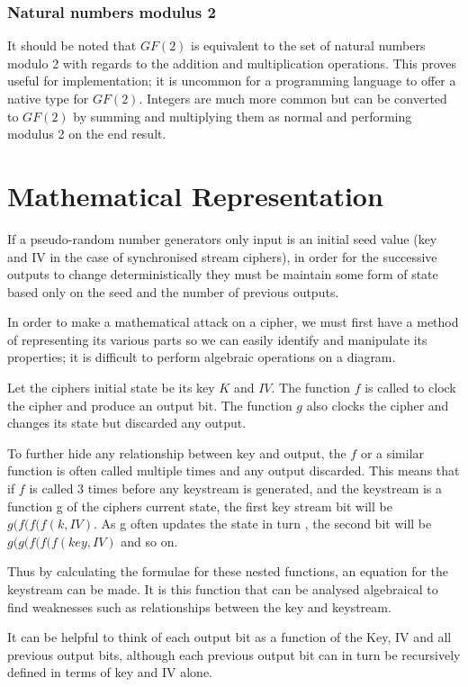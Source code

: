 \documentclass{report}
\let\Oldsection\section
\renewcommand{\section}{\FloatBarrier\Oldsection}
\let\Oldsubsubsection\subsubsection
\renewcommand{\subsubsection}{\FloatBarrier\Oldsubsubsection}
\begin{document}
\subsubsection{Natural numbers modulus 2}
It should be noted that $\mathit{GF(2)}$ is equivalent to the set of natural numbers modulo 2 with regards to the addition and multiplication operations. This proves useful for implementation; it is uncommon for a programming language to offer a native type for $\mathit{GF(2)}$. Integers are much more common but can be converted to $\mathit{GF(2)}$ by summing and multiplying them as normal and performing modulus 2 on the end result.


\section{Mathematical Representation}
If a pseudo-random number generators only input is an initial seed value (key and IV in the case of synchronised stream ciphers), in order for the successive outputs to change deterministically they must be maintain some form of state based only on the seed and the number of previous outputs.

In order to make a mathematical attack on a cipher, we must first have a method
of representing its various parts so we can easily identify and manipulate its properties; it is difficult to perform algebraic operations on a diagram.

Let the ciphers initial state be its key $K$ and $IV$. The function $f$ is called to clock the cipher and produce an output bit. The function $g$ also clocks the cipher and changes its state but discarded any output.

To further hide any relationship between key and output, the $f$ or a similar function is often called multiple times and any output discarded. This means that if $f$ is called 3 times before any keystream is generated, and the keystream is a function g of the ciphers current state, the first key stream bit will be $g(f(f(f(k, IV)$. As g often updates the state in turn , the second bit will be $g(g(f(f(f(key, IV)$ and so on.

Thus by calculating the formulae for these nested functions, an equation for the keystream can be made. It is this function that can be analysed algebraical to find weaknesses such as relationships between the key and keystream.

It can be helpful to think of each output bit as a function of the Key, IV and all previous output bits, although each previous output bit can in turn be recursively defined in terms of key and IV alone.
\end{document}

